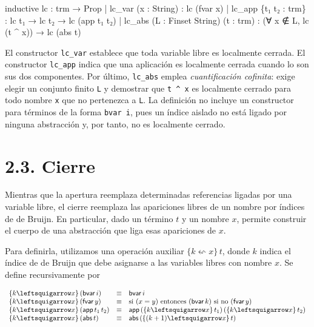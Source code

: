 \documentclass[
  spanish,
  letterpaper,
  DIV=11,
  numbers=noendperiod]{scrreprt}
\newenvironment{Shaded}{\begin{snugshade}}{\end{snugshade}}
\newcommand{\KeywordTok}[1]{\textcolor[rgb]{0.00,0.23,0.31}{\textbf{#1}}}
\newcommand{\NormalTok}[1]{\textcolor[rgb]{0.00,0.23,0.31}{#1}}
\renewcommand{\NormalTok}[1]{\textcolor[HTML]{000000}{#1}}
\renewcommand{\KeywordTok}[1]{\textcolor[HTML]{0000FF}{#1}}
\theoremstyle{remark}
\begin{document}
\begin{Shaded}
\begin{Highlighting}[]
\NormalTok{inductive lc : trm → }\KeywordTok{Prop}
\NormalTok{  | lc\_var (x : String) :}
\NormalTok{      lc (fvar x)}
\NormalTok{  | lc\_app \{t₁ t₂ : trm\} :}
\NormalTok{      lc t₁ → lc t₂ → lc (app t₁ t₂)}
\NormalTok{  | lc\_abs (L : Finset String) (t : trm) :}
\NormalTok{      (∀ x ∉ L, lc (t \^{} x)) →}
\NormalTok{      lc (abs t)}
\end{Highlighting}
\end{Shaded}

El constructor \texttt{lc\_var} establece que toda variable libre es
localmente cerrada. El constructor \texttt{lc\_app} indica que una
aplicación es localmente cerrada cuando lo son sus dos componentes. Por
último, \texttt{lc\_abs} emplea \emph{cuantificación cofinita}: exige
elegir un conjunto finito \texttt{L} y demostrar que \texttt{t\ \^{}\ x}
es localmente cerrado para todo nombre \texttt{x} que no pertenezca a
\texttt{L}. La definición no incluye un constructor para términos de la
forma \texttt{bvar\ i}, pues un índice aislado no está ligado por
ninguna abstracción y, por tanto, no es localmente cerrado.

\section{2.3. Cierre}\label{cierre}

Mientras que la apertura reemplaza determinadas referencias ligadas por
una variable libre, el cierre reemplaza las apariciones libres de un
nombre por índices de de Bruijn. En particular, dado un término \(t\) y
un nombre \(x\), permite construir el cuerpo de una abstracción que liga
esas apariciones de \(x\).

Para definirla, utilizamos una operación auxiliar
\(\{k \leftsquigarrow x \} \, t\), donde \(k\) indica el índice de de
Bruijn que debe asignarse a las variables libres con nombre \(x\). Se
define recursivamente por

\[
\begin{array}{l c l}
\{k \leftsquigarrow x\} \, (\mathsf{bvar}\, i) & \equiv & \mathsf{bvar}\, i \\ 
\{k \leftsquigarrow x\} \, (\mathsf{fvar}\, y) & \equiv & \text{si } (x = y) \text{ entonces } (\mathsf{bvar}\, k) \text{ si no } (\mathsf{fvar}\, y) \\ 
\{k \leftsquigarrow x\} \, (\mathsf{app}\, t_1 \, t_2) & \equiv & \mathsf{app}\, (\{k \leftsquigarrow x \} \, t_1) \, (\{k \leftsquigarrow x\} \, t_2) \\ 
\{k \leftsquigarrow x\} \, (\mathsf{abs}\, t) & \equiv & \mathsf{abs}\, (\{(k + 1) \leftsquigarrow x\} \, t)
\end{array}
\]
\end{document}
